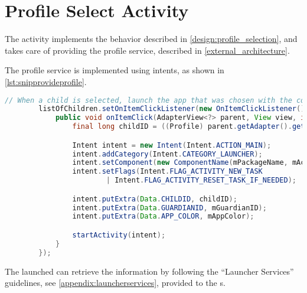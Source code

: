 \section{Profile Select Activity}

The  activity implements the behavior described in \autoref{design:profile_selection}, and takes care of providing the profile service, described in \autoref{external_architecture}.

The profile service is implemented using intents, as shown in \autoref{lst:snipprovideprofile}.

\begin{lstlisting}[style=sourceCode, language=JAVA, caption=Code snippet showing the provision of profile data, label=lst:snipprovideprofile]
		// When a child is selected, launch the app that was chosen with the correct data in the extras.
		listOfChildren.setOnItemClickListener(new OnItemClickListener() {
			public void onItemClick(AdapterView<?> parent, View view, int position, long id) {
				final long childID = ((Profile) parent.getAdapter().getItem(position)).getId();

				Intent intent = new Intent(Intent.ACTION_MAIN);
				intent.addCategory(Intent.CATEGORY_LAUNCHER);
				intent.setComponent(new ComponentName(mPackageName, mActivityName));
				intent.setFlags(Intent.FLAG_ACTIVITY_NEW_TASK
						| Intent.FLAG_ACTIVITY_RESET_TASK_IF_NEEDED);

				intent.putExtra(Data.CHILDID, childID);
				intent.putExtra(Data.GUARDIANID, mGuardianID);
				intent.putExtra(Data.APP_COLOR, mAppColor);

				startActivity(intent);
			}
		});
\end{lstlisting}

The launched \girafapp[] can retrieve the information by following the ``Launcher Services'' guidelines, see \autoref{appendix:launcherservices}, provided to the \localgroup[]s.